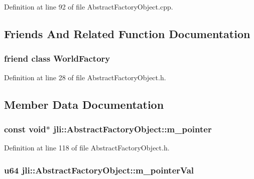 Definition at line 92 of file Abstract\+Factory\+Object.\+cpp.



\subsection{Friends And Related Function Documentation}
\hypertarget{classjli_1_1_abstract_factory_object_acb96ebb09abe8f2a37a915a842babfac}{
\subsubsection[{World\+Factory}]{\setlength{\rightskip}{0pt plus 5cm}friend class {\bf World\+Factory}\hspace{0.3cm}{\ttfamily [friend]}}}\label{classjli_1_1_abstract_factory_object_acb96ebb09abe8f2a37a915a842babfac}


Definition at line 28 of file Abstract\+Factory\+Object.\+h.



\subsection{Member Data Documentation}
\hypertarget{classjli_1_1_abstract_factory_object_ab543e65fa384673f153c01947e3573a1}{
\subsubsection[{m\+\_\+pointer}]{\setlength{\rightskip}{0pt plus 5cm}const void$\ast$ jli\+::\+Abstract\+Factory\+Object\+::m\+\_\+pointer}}\label{classjli_1_1_abstract_factory_object_ab543e65fa384673f153c01947e3573a1}


Definition at line 118 of file Abstract\+Factory\+Object.\+h.

\hypertarget{classjli_1_1_abstract_factory_object_a12422dceb4d3678e0c2beef4204538ea}{
\subsubsection[{m\+\_\+pointer\+Val}]{\setlength{\rightskip}{0pt plus 5cm}u64 jli\+::\+Abstract\+Factory\+Object\+::m\+\_\+pointer\+Val}}\label{classjli_1_1_abstract_factory_object_a12422dceb4d3678e0c2beef4204538ea}


